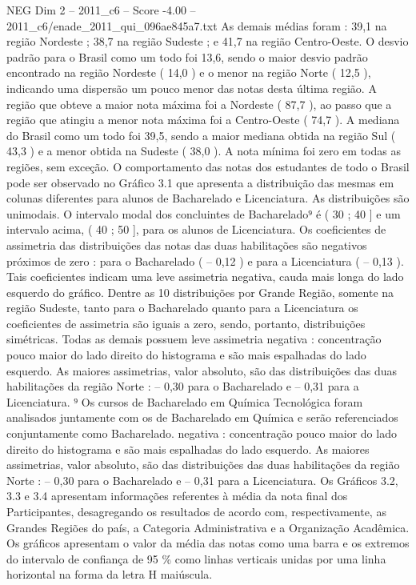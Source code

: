 \begin{textsample}{NEG Dim 2 – 2011\_c6 – Score -4.00 – 2011\_c6/enade\_2011\_qui\_096ae845a7.txt}
As demais médias foram : 39,1 na região Nordeste ; 38,7 na região Sudeste ; e 41,7 na região Centro-Oeste.
O desvio padrão para o Brasil como um todo foi 13,6, sendo o maior desvio padrão encontrado na região Nordeste ( 14,0 ) e o menor na região Norte ( 12,5 ), indicando uma dispersão um pouco menor das notas desta última região.
A região que obteve a maior nota máxima foi a Nordeste ( 87,7 ), ao passo que a região que atingiu a menor nota máxima foi a Centro-Oeste ( 74,7 ).
A mediana do Brasil como um todo foi 39,5, sendo a maior mediana obtida na região Sul ( 43,3 ) e a menor obtida na Sudeste ( 38,0 ).
A nota mínima foi zero em todas as regiões, sem exceção.
O comportamento das notas dos estudantes de todo o Brasil pode ser observado no Gráfico 3.1 que apresenta a distribuição das mesmas em colunas diferentes para alunos de Bacharelado e Licenciatura.
As distribuições são unimodais.
O intervalo modal dos concluintes de Bacharelado⁹ é ( 30 ; 40 ] e um intervalo acima, ( 40 ; 50 ], para os alunos de Licenciatura.
Os coeficientes de assimetria das distribuições das notas das duas habilitações são negativos próximos de zero : para o Bacharelado ( – 0,12 ) e para a Licenciatura ( – 0,13 ).
Tais coeficientes indicam uma leve assimetria negativa, cauda mais longa do lado esquerdo do gráfico.
Dentre as 10 distribuições por Grande Região, somente na região Sudeste, tanto para o Bacharelado quanto para a Licenciatura os coeficientes de assimetria são iguais a zero, sendo, portanto, distribuições simétricas.
Todas as demais possuem leve assimetria negativa : concentração pouco maior do lado direito do histograma e são mais espalhadas do lado esquerdo.
As maiores assimetrias, valor absoluto, são das distribuições das duas habilitações da região Norte : – 0,30 para o Bacharelado e – 0,31 para a Licenciatura. ⁹ Os cursos de Bacharelado em Química Tecnológica foram analisados juntamente com os de Bacharelado em Química e serão referenciados conjuntamente como Bacharelado. negativa : concentração pouco maior do lado direito do histograma e são mais espalhadas do lado esquerdo.
As maiores assimetrias, valor absoluto, são das distribuições das duas habilitações da região Norte : – 0,30 para o Bacharelado e – 0,31 para a Licenciatura.
Os Gráficos 3.2, 3.3 e 3.4 apresentam informações referentes à média da nota final dos Participantes, desagregando os resultados de acordo com, respectivamente, as Grandes Regiões do país, a Categoria Administrativa e a Organização Acadêmica.
Os gráficos apresentam o valor da média das notas como uma barra e os extremos do intervalo de confiança de 95 \% como linhas verticais unidas por uma linha horizontal na forma da letra H maiúscula.

\end{textsample}
